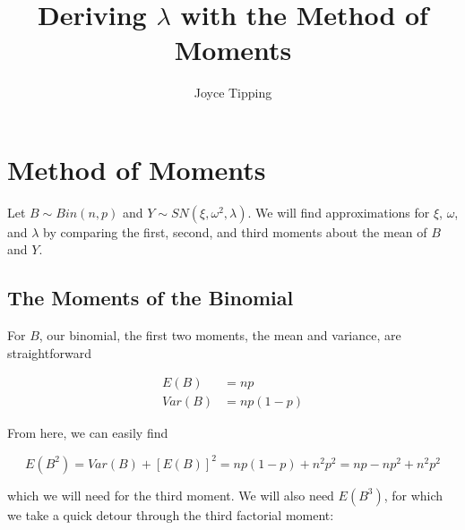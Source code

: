 \documentclass{article}
\begin{document}
\title {Deriving $\lambda$ with the Method of Moments}
\author {Joyce Tipping}
\date{}
\maketitle

\section{Method of Moments}

Let $B \sim Bin(n, p)$ and $Y \sim SN(\xi, \omega^2, \lambda)$. We will find approximations for
$\xi$, $\omega$, and $\lambda$ by comparing the first, second, and third moments about the mean of
$B$ and $Y$.

\subsection{The Moments of the Binomial}

For $B$, our binomial, the first two moments, the mean and variance, are straightforward

\begin{align}
  E(B) &= np \\
  Var(B) &= np(1-p) \nonumber
\end{align}

From here, we can easily find

\begin{equation}
  E(B^2) = Var(B) + [E(B)]^2 = np(1-p) + n^2p^2 = np - np^2 + n^2p^2
\end{equation}

which we will need for the third moment. We will also need $E(B^3)$, for which we take a quick
detour through the third factorial moment:
\end{document}
